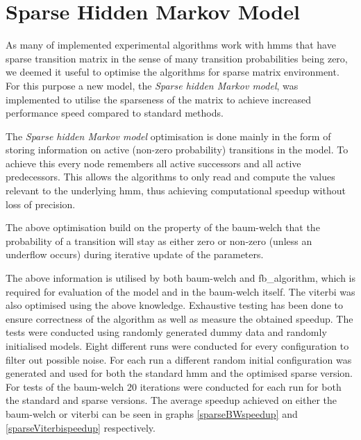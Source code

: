 \section{Sparse Hidden Markov Model}

As many of implemented experimental algorithms work with \glspl{hmm} that have sparse transition matrix in the sense of many transition probabilities being zero, we deemed it useful to optimise the algorithms for sparse matrix environment. For this purpose a new model, the \emph{Sparse hidden Markov model}, was implemented to utilise the sparseness of the matrix to achieve increased performance speed compared to standard methods.

The \emph{Sparse hidden Markov model} optimisation is done mainly in the form of storing information on active (non-zero probability) transitions in the model. To achieve this every node remembers all active successors and all active predecessors. This allows the algorithms to only read and compute the values relevant to the underlying \gls{hmm}, thus achieving computational speedup without loss of precision.

The above optimisation build on the property of the \gls{baum-welch} that the probability of a transition will stay as either zero or non-zero (unless an underflow occurs) during iterative update of the parameters.

The above information is utilised by both \gls{baum-welch} and \gls{fb_algorithm}, which is required for evaluation of the model and in the \gls{baum-welch} itself. The \gls{viterbi} was also optimised using the above knowledge. Exhaustive testing has been done to ensure correctness of the algorithm as well as measure the obtained speedup. The tests were conducted using randomly generated dummy data and randomly initialised models. Eight different runs were conducted for every configuration to filter out possible noise. For each run a different random initial configuration was generated and used for both the standard \gls{hmm} and the optimised sparse version. For tests of the \gls{baum-welch} $20$ iterations were conducted for each run for both the standard and sparse versions. The average speedup achieved on either the \gls{baum-welch} or \gls{viterbi} can be seen in graphs \ref{sparseBWspeedup} and \ref{sparseViterbispeedup} respectively.

